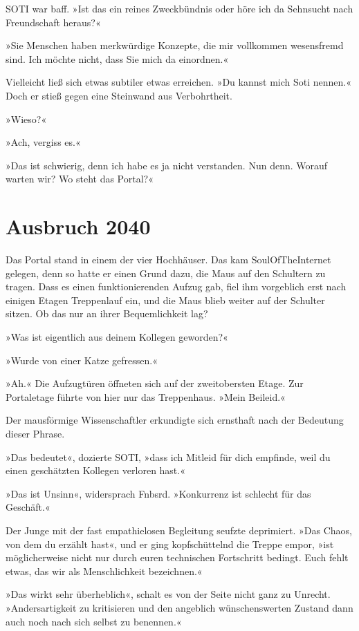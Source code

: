 SOTI war baff. »Ist das ein reines Zweckbündnis oder höre ich da Sehnsucht nach Freundschaft heraus?«

»Sie Menschen haben merkwürdige Konzepte, die mir vollkommen wesensfremd sind. Ich möchte nicht, dass Sie mich da einordnen.«

Vielleicht ließ sich etwas subtiler etwas erreichen. »Du kannst mich Soti nennen.« Doch er stieß gegen eine Steinwand aus Verbohrtheit.

»Wieso?«

»Ach, vergiss es.«

»Das ist schwierig, denn ich habe es ja nicht verstanden. Nun denn. Worauf warten wir? Wo steht das Portal?«


\chapter{Ausbruch 2040}

Das Portal stand in einem der vier Hochhäuser. Das kam SoulOfTheInternet gelegen, denn so hatte er einen Grund dazu, die Maus auf den Schultern zu tragen. Dass es einen funktionierenden Aufzug gab, fiel ihm vorgeblich erst nach einigen Etagen Treppenlauf ein, und die Maus blieb weiter auf der Schulter sitzen. Ob das nur an ihrer Bequemlichkeit lag?

»Was ist eigentlich aus deinem Kollegen geworden?«

»Wurde von einer Katze gefressen.«

»Ah.« Die Aufzugtüren öffneten sich auf der zweitobersten Etage. Zur Portaletage führte von hier nur das Treppenhaus. »Mein Beileid.«

Der mausförmige Wissenschaftler erkundigte sich ernsthaft nach der Bedeutung dieser Phrase.

»Das bedeutet«, dozierte SOTI, »dass ich Mitleid für dich empfinde, weil du einen geschätzten Kollegen verloren hast.«

»Das ist Unsinn«, widersprach Fnbsrd. »Konkurrenz ist schlecht für das Geschäft.«

Der Junge mit der fast empathielosen Begleitung seufzte deprimiert. »Das Chaos, von dem du erzählt hast«, und er ging kopfschüttelnd die Treppe empor, »ist möglicherweise nicht nur durch euren technischen Fortschritt bedingt. Euch fehlt etwas, das wir als Menschlichkeit bezeichnen.«

»Das wirkt sehr überheblich«, schalt es von der Seite nicht ganz zu Unrecht. »Andersartigkeit zu kritisieren und den angeblich wünschenswerten Zustand dann auch noch nach sich selbst zu benennen.«

